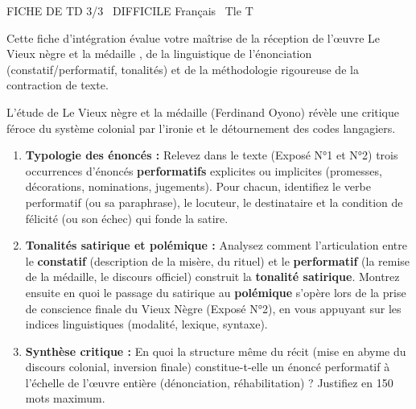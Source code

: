 \documentclass[11pt]{article}
\begin{document}
\begin{tcolorbox}[enhanced,colback=popink,colframe=popink,arc=10pt,boxrule=0pt,left=12pt,right=12pt,top=9pt,bottom=9pt]
{\color{white}\popxbold\small FICHE DE TD 3/3 \textbullet\ DIFFICILE \hfill Français \textbullet\ Tle T\par}
\end{tcolorbox}
\vspace{4pt}
Cette fiche d'intégration évalue votre maîtrise de la réception de l'œuvre \og Le Vieux nègre et la médaille \fg{}, de la linguistique de l'énonciation (constatif/performatif, tonalités) et de la méthodologie rigoureuse de la contraction de texte.

\begin{exercice}
L'étude de \og Le Vieux nègre et la médaille \fg{} (Ferdinand Oyono) révèle une critique féroce du système colonial par l'ironie et le détournement des codes langagiers.
\begin{enumerate}
    \item \textbf{Typologie des énoncés :} Relevez dans le texte (Exposé N°1 et N°2) trois occurrences d'énoncés \textbf{performatifs} explicites ou implicites (promesses, décorations, nominations, jugements). Pour chacun, identifiez le verbe performatif (ou sa paraphrase), le locuteur, le destinataire et la condition de félicité (ou son échec) qui fonde la satire.
    \item \textbf{Tonalités satirique et polémique :} Analysez comment l'articulation entre le \textbf{constatif} (description de la misère, du rituel) et le \textbf{performatif} (la remise de la médaille, le discours officiel) construit la \textbf{tonalité satirique}. Montrez ensuite en quoi le passage du satirique au \textbf{polémique} s'opère lors de la prise de conscience finale du Vieux Nègre (Exposé N°2), en vous appuyant sur les indices linguistiques (modalité, lexique, syntaxe).
    \item \textbf{Synthèse critique :} En quoi la structure même du récit (mise en abyme du discours colonial, inversion finale) constitue-t-elle un \og énoncé performatif \fg{} à l'échelle de l'œuvre entière (dénonciation, réhabilitation) ? Justifiez en 150 mots maximum.
\end{enumerate}
\end{exercice}
\end{document}
